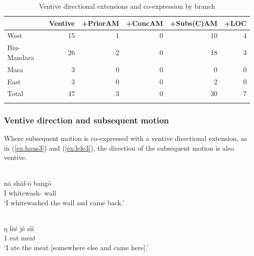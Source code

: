 \begin{table}
	\caption{Ventive directional extensions and co-expression by branch}
	\label{tab:vent_plusTABLE}
	\begin{tabular}{lrrrrr} %
		\lsptoprule
           {} &  Ventive &  +PriorAM &  +ConcAM &  +Subs(C)AM &  +LOC \\
\midrule
West &       15 &         1 &        0 &          10 &     4 \\
Biu-Mandara & 26 &         2 &        0 &          18 &     3 \\
Masa &        3 &         0 &        0 &           0 &     0 \\
East &        3 &         0 &        0 &           2 &     0 \\
Total &       47 &         3 &        0 &          30 &     7 \\
		\lspbottomrule
	\end{tabular}
\end{table}

\subsubsection{Ventive direction and subsequent motion}

Where subsequent motion is co-expressed with a ventive directional extension, as in (\ref{ex:haus3}) and (\ref{ex:lele3}), the direction of the subsequent motion is also ventive. 

\ea\label{ex:haus3}
 \\
\gll nā	shāf-ō	bangō	 \\
I	whitewash-	wall \\
\glt `I whitewashed the wall and came back.'

\ex\label{ex:lele3}
 \\
\gll ŋ	lèé	jè	sìí \\
1	eat		meat \\
\glt `I ate the meat [somewhere else and came here].'
\z 


